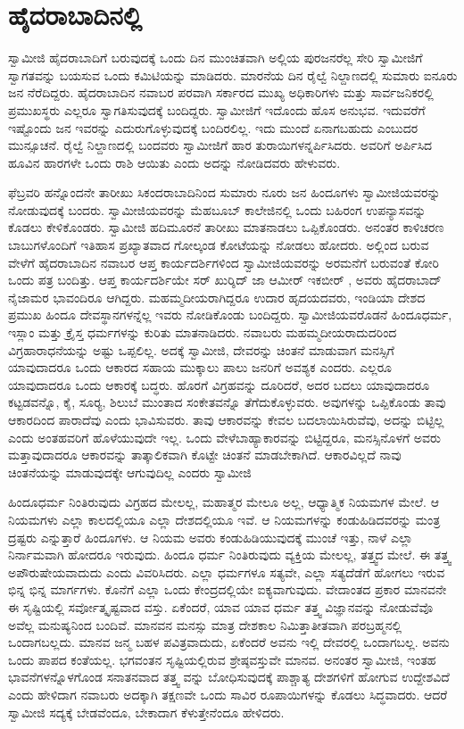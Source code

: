 
\chapter{ಹೈದರಾಬಾದಿನಲ್ಲಿ}

 ಸ್ವಾಮೀಜಿ ಹೈದರಾಬಾದಿಗೆ ಬರುವುದಕ್ಕೆ ಒಂದು ದಿನ ಮುಂಚಿತವಾಗಿ ಅಲ್ಲಿಯ ಪುರಜನರೆಲ್ಲ ಸೇರಿ ಸ್ವಾಮೀಜಿಗೆ ಸ್ವಾಗತವನ್ನು ಬಯಸುವ ಒಂದು ಕಮಿಟಿಯನ್ನು ಮಾಡಿದರು. ಮಾರನೆಯ ದಿನ ರೈಲ್ವೆ ನಿಲ್ದಾಣದಲ್ಲಿ ಸುಮಾರು ಐನೂರು ಜನ ನೆರೆದಿದ್ದರು. ಹೈದರಾಬಾದಿನ ನವಾಬರ ಪರವಾಗಿ ಸರ್ಕಾರದ ಮುಖ್ಯ ಅಧಿಕಾರಿಗಳು ಮತ್ತು ಸಾರ್ವಜನಿಕರಲ್ಲಿ ಪ್ರಮುಖಸ್ಥರು ಎಲ್ಲರೂ ಸ್ವಾಗತಿಸುವುದಕ್ಕೆ ಬಂದಿದ್ದರು. ಸ್ವಾಮೀಜಿಗೆ ಇದೊಂದು ಹೊಸ ಅನುಭವ. ಇದುವರೆಗೆ ಇಷ್ಟೊಂದು ಜನ ಇವರನ್ನು ಎದುರುಗೊಳ್ಳುವುದಕ್ಕೆ ಬಂದಿರಲಿಲ್ಲ. ಇದು ಮುಂದೆ ಏನಾಗಬಹುದು ಎಂಬುದರ ಮುನ್ಸೂಚನೆ. ರೈಲ್ವೆ ನಿಲ್ದಾಣದಲ್ಲಿ ಬಂದವರು ಸ್ವಾಮೀಜಿಗೆ ಹಾರ ತುರಾಯಿಗಳನ್ನರ್ಪಿಸಿದರು. ಅವರಿಗೆ ಅರ್ಪಿಸಿದ ಹೂವಿನ ಹಾರಗಳೇ ಒಂದು ರಾಶಿ ಆಯಿತು ಎಂದು ಅದನ್ನು ನೋಡಿದವರು ಹೇಳುವರು. 

 ಫೆಬ್ರವರಿ ಹನ್ನೊಂದನೇ ತಾರೀಖು ಸಿಕಂದರಾಬಾದಿನಿಂದ ಸುಮಾರು ನೂರು ಜನ ಹಿಂದೂಗಳು ಸ್ವಾಮೀಜಿಯವರನ್ನು ನೋಡುವುದಕ್ಕೆ ಬಂದರು. ಸ್ವಾಮೀಜಿಯವರನ್ನು ಮೆಹಬೂಬ್ ಕಾಲೇಜಿನಲ್ಲಿ ಒಂದು ಬಹಿರಂಗ ಉಪನ್ಯಾಸವನ್ನು ಕೊಡಲು ಕೇಳಿಕೊಂಡರು. ಸ್ವಾಮೀಜಿ ಹದಿಮೂರನೆ ತಾರೀಖು ಮಾತನಾಡಲು ಒಪ್ಪಿಕೊಂಡರು. ಅನಂತರ ಕಾಳಿಚರಣ ಬಾಬುಗಳೊಂದಿಗೆ ಇತಿಹಾಸ ಪ್ರಖ್ಯಾತವಾದ ಗೋಲ್ಕಂಡ ಕೋಟೆಯನ್ನು ನೋಡಲು ಹೋದರು. ಅಲ್ಲಿಂದ ಬರುವ ವೇಳೆಗೆ ಹೈದರಾಬಾದಿನ ನವಾಬರ ಆಪ್ತ ಕಾರ್ಯದರ್ಶಿಗಳಿಂದ ಸ್ವಾಮೀಜಿಯವರನ್ನು ಅರಮನೆಗೆ ಬರುವಂತೆ ಕೋರಿ ಒಂದು ಪತ್ರ ಬಂದಿತ್ತು. ಆಪ್ತ ಕಾರ್ಯದರ್ಶಿಯೇ ಸರ್ ಖುರ್‍ಶಿದ್ ಜಾ ಆಮೀರ್ ಇಕಬೀರ್ , ಅವರು ಹೈದರಾಬಾದ್ ನೈಜಾಮರ ಭಾವಂದಿರೂ ಆಗಿದ್ದರು. ಮಹಮ್ಮದೀಯರಾಗಿದ್ದರೂ ಉದಾರ ಹೃದಯದವರು, ಇಂಡಿಯಾ ದೇಶದ ಪ್ರಮುಖ ಹಿಂದೂ ದೇವಸ್ಥಾನಗಳನ್ನೆಲ್ಲ ಇವರು ನೋಡಿಕೊಂಡು ಬಂದಿದ್ದರು. ಸ್ವಾಮೀಜಿಯವರೊಡನೆ ಹಿಂದೂಧರ್ಮ, ಇಸ್ಲಾಂ ಮತ್ತು ಕ್ರೈಸ್ತ ಧರ್ಮಗಳನ್ನು ಕುರಿತು ಮಾತನಾಡಿದರು. ನವಾಬರು ಮಹಮ್ಮದೀಯರಾದುದರಿಂದ ವಿಗ್ರಹಾರಾಧನೆಯನ್ನು ಅಷ್ಟು ಒಪ್ಪಲಿಲ್ಲ. ಅದಕ್ಕೆ ಸ್ವಾಮೀಜಿ, ದೇವರನ್ನು ಚಿಂತನೆ ಮಾಡುವಾಗ ಮನಸ್ಸಿಗೆ ಯಾವುದಾದರೂ ಒಂದು ಆಕಾರದ ಸಹಾಯ ಮುಕ್ಕಾಲು ಪಾಲು ಜನರಿಗೆ ಅವಶ್ಯಕ ಎಂದರು. ಎಲ್ಲರೂ ಯಾವುದಾದರೂ ಒಂದು ಆಕಾರಕ್ಕೆ ಬದ್ಧರು. ಹೊರಗೆ ವಿಗ್ರಹವನ್ನು ದೂರಿದರೆ, ಅದರ ಬದಲು ಯಾವುದಾದರೂ ಕಟ್ಟಡವನ್ನೊ, ಕೈ, ಸೂರ‍್ಯ, ಶಿಲುಬೆ ಮುಂತಾದ ಸಂಕೇತವನ್ನೊ ತೆಗೆದುಕೊಳ್ಳುವರು. ಅವುಗಳನ್ನು ಒಪ್ಪಿಕೊಂಡು ತಾವು ಆಕಾರದಿಂದ ಪಾರಾದೆವು ಎಂದು ಭಾವಿಸುವರು. ತಾವು ಆಕಾರವನ್ನು ಕೇವಲ ಬದಲಾಯಿಸಿರುವೆವು, ಅದನ್ನು ಬಿಟ್ಟಿಲ್ಲ ಎಂದು ಅಂತಹವರಿಗೆ ಹೊಳೆಯುವುದೇ ಇಲ್ಲ. ಒಂದು ವೇಳೆ\break ಬಾಹ್ಯಾಕಾರವನ್ನು ಬಿಟ್ಟಿದ್ದರೂ, ಮನಸ್ಸಿನೊಳಗೆ ಅವರು ಮತ್ತಾವುದಾದರೂ ಆಕಾರವನ್ನು ತಾತ್ಕಾಲಿಕವಾಗಿ ಕೊಟ್ಟೇ ಚಿಂತನೆ ಮಾಡಬೇಕಾಗಿದೆ. ಆಕಾರವಿಲ್ಲದೆ ನಾವು ಚಿಂತನೆಯನ್ನು ಮಾಡುವುದಕ್ಕೇ ಆಗುವುದಿಲ್ಲ ಎಂದರು ಸ್ವಾಮೀಜಿ

 ಹಿಂದೂಧರ್ಮ ನಿಂತಿರುವುದು ವಿಗ್ರಹದ ಮೇಲಲ್ಲ, ಮಹಾತ್ಮರ ಮೇಲೂ ಅಲ್ಲ, ಆಧ್ಯಾತ್ಮಿಕ ನಿಯಮಗಳ ಮೇಲೆ. ಆ ನಿಯಮಗಳು ಎಲ್ಲಾ ಕಾಲದಲ್ಲಿಯೂ ಎಲ್ಲಾ ದೇಶದಲ್ಲಿಯೂ ಇವೆ. ಆ ನಿಯಮಗಳನ್ನು ಕಂಡುಹಿಡಿದವರನ್ನು ಮಂತ್ರ ದ್ರಷ್ಟರು ಎನ್ನುತ್ತಾರೆ ಹಿಂದೂಗಳು. ಆ ನಿಯಮ ಅವರು ಕಂಡುಹಿಡಿಯುವುದಕ್ಕೆ ಮುಂಚೆ ಇತ್ತು, ನಾಳೆ ಎಲ್ಲಾ ನಿರ್ನಾಮವಾಗಿ ಹೋದರೂ ಇರುವುದು. ಹಿಂದೂ ಧರ್ಮ ನಿಂತಿರುವುದು ವ್ಯಕ್ತಿಯ ಮೇಲಲ್ಲ, ತತ್ತ್ವದ ಮೇಲೆ. ಈ ತತ್ತ್ವ ಅಪೌರುಷೇಯವಾದುದು ಎಂದು ವಿವರಿಸಿದರು. ಎಲ್ಲಾ ಧರ್ಮಗಳೂ ಸತ್ಯವೇ, ಎಲ್ಲಾ ಸತ್ಯದೆಡೆಗೆ ಹೋಗಲು ಇರುವ ಭಿನ್ನ ಭಿನ್ನ ಮಾರ್ಗಗಳು. ಕೊನೆಗೆ ಎಲ್ಲಾ ಒಂದು ಕೇಂದ್ರದಲ್ಲಿಯೇ ಐಕ್ಯವಾಗುವುದು. ವೇದಾಂತದ ಪ್ರಕಾರ ಮಾನವನೇ ಈ ಸೃಷ್ಟಿಯಲ್ಲಿ ಸರ್ವೋತ್ಕೃಷ್ಟವಾದ ವಸ್ತು. ಏಕೆಂದರೆ, ಯಾವ ಯಾವ ಧರ್ಮ ತತ್ತ್ವ ವಿಜ್ಞಾನವನ್ನು ನೋಡುವೆವೊ ಅವೆಲ್ಲ ಮನುಷ್ಯನಿಂದ ಬಂದಿವೆ. ಮಾನವನ ಮನಸ್ಸು ಮಾತ್ರ ದೇಶಕಾಲ ನಿಮಿತ್ತಾತೀತವಾಗಿ ಪರಬ್ರಹ್ಮನಲ್ಲಿ ಒಂದಾಗಬಲ್ಲದು. ಮಾನವ ಜನ್ಮ ಬಹಳ ಪವಿತ್ರವಾದುದು, ಏಕೆಂದರೆ ಅವನು ಇಲ್ಲಿ ದೇವರಲ್ಲಿ ಒಂದಾಗಬಲ್ಲ. ಅವನು ಒಂದು ಪಾಪದ ಕಂತೆಯಲ್ಲ. ಭಗವಂತನ ಸೃಷ್ಟಿಯಲ್ಲಿರುವ ಶ್ರೇಷ್ಠವಸ್ತುವೇ ಮಾನವ. ಅನಂತರ ಸ್ವಾಮೀಜಿ, ಇಂತಹ ಭಾವನೆಗಳನ್ನೊಳಗೊಂಡ ಸನಾತನವಾದ ತತ್ತ್ವ ವನ್ನು ಬೋಧಿಸುವುದಕ್ಕೆ ಪಾಶ್ಚಾತ್ಯ ದೇಶಗಳಿಗೆ ಹೋಗುವ ಉದ್ದೇಶವಿದೆ ಎಂದು ಹೇಳಿದಾಗ ನವಾಬರು ಅದಕ್ಕಾಗಿ ತಕ್ಷಣವೇ ಒಂದು ಸಾವಿರ ರೂಪಾಯಿಗಳನ್ನು ಕೊಡಲು ಸಿದ್ಧವಾದರು. ಆದರೆ ಸ್ವಾಮೀಜಿ ಸದ್ಯಕ್ಕೆ ಬೇಡವೆಂದೂ, ಬೇಕಾದಾಗ ಕೆಳುತ್ತೇನೆಂದೂ ಹೇಳಿದರು.

